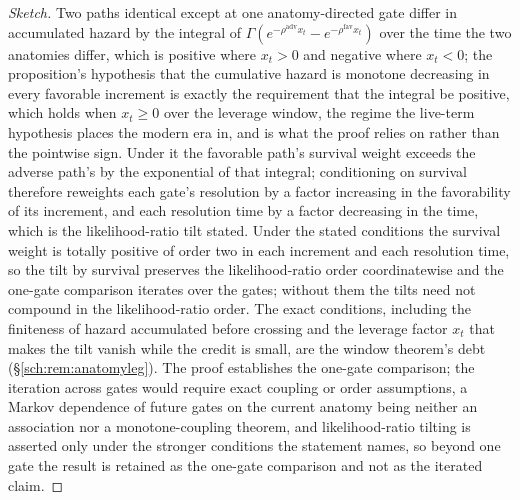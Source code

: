 \begin{proof}[Sketch]
Two paths identical except at one anatomy-directed gate differ in
accumulated hazard by the integral of
$\Gamma(e^{-\rho^{\mathrm{adv}}x_t}-e^{-\rho^{\mathrm{fav}}x_t})$ over the
time the two anatomies differ, which is positive where $x_t>0$ and
negative where $x_t<0$; the proposition's hypothesis that the
cumulative hazard is monotone decreasing in every favorable increment
is exactly the requirement that the integral be positive, which holds
when $x_t\ge0$ over the leverage window, the regime the live-term
hypothesis places the modern era in, and is what the proof relies on
rather than the pointwise sign. Under it the favorable path's survival
weight exceeds the adverse path's by the exponential of that integral; conditioning on survival therefore reweights each gate's
resolution by a factor increasing in the favorability of its
increment, and each resolution time by a factor decreasing in the
time, which is the likelihood-ratio tilt stated. Under the stated conditions the survival weight is totally positive of
order two in each increment and each resolution time, so the tilt by
survival preserves the likelihood-ratio order coordinatewise and the
one-gate comparison iterates over the gates; without them the tilts need
not compound in the likelihood-ratio order. The exact conditions, including the
finiteness of hazard accumulated before crossing and the leverage
factor $x_t$ that makes the tilt vanish while the credit is small,
are the window theorem's debt (\S\ref{sch:rem:anatomyleg}).
 The proof establishes the one-gate comparison; the iteration across gates would require exact coupling or order assumptions, a Markov dependence of future gates on the current anatomy being neither an association nor a monotone-coupling theorem, and likelihood-ratio tilting is asserted only under the stronger conditions the statement names, so beyond one gate the result is retained as the one-gate comparison and not as the iterated claim. \end{proof}


